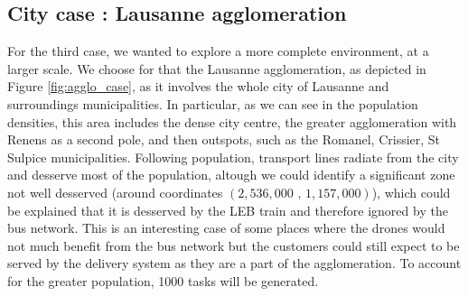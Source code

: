 \subsection{City case : Lausanne agglomeration}

For the third case, we wanted to explore a more complete environment, at a larger scale. We choose for that the Lausanne agglomeration, as depicted in Figure \ref{fig:agglo_case}, as it involves the whole city of Lausanne and surroundings municipalities. In particular, as we can see in the population densities, this area includes the dense city centre, the greater agglomeration with Renens as a second pole, and then outspots, such as the Romanel, Crissier, St Sulpice municipalities. Following population, transport lines radiate from the city and desserve most of the population, altough we could identify a significant zone not well desserved (around coordinates $(2,536,000\text{ , }1,157,000)$), which could be explained that it is desserved by the LEB train and therefore ignored by the bus network. This is an interesting case of some places where the drones would not much benefit from the bus network but the customers could still expect to be served by the delivery system as they are a part of the agglomeration. To account for the greater population, 1000 tasks will be generated.

